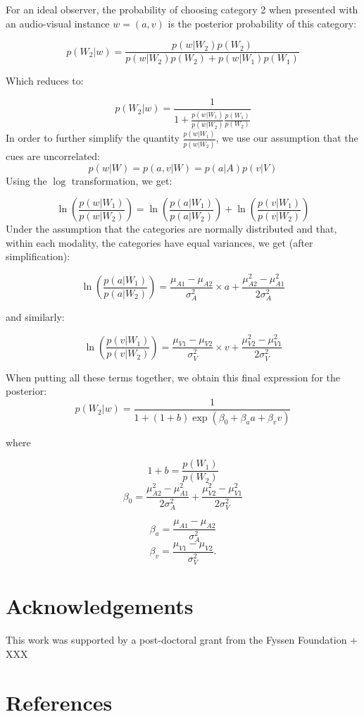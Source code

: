 \documentclass[english,floatsintext,man]{apa6}
\theoremstyle{definition}
\theoremstyle{definition}
\theoremstyle{definition}
\theoremstyle{remark}
\begin{document}
For an ideal observer, the probability of choosing category 2 when
presented with an audio-visual instance \(w = (a, v)\) is the posterior
probability of this category:

\[p(W_2 | w)=\frac{p(w|W_2)p(W_2)}{p(w|W_2)p(W_2)+p(w|W_1)p(W_1)}\]

Which reduces to:

\[p(W_2 | w)=\frac{1}{1+\frac{p(w|W_1)}{p(w|W_2)} \frac{p(W_1)}{p(W_2)}}\]
In order to further simplify the quantity \(\frac{p(w|W_1)}{p(w|W_2)}\),
we use our assumption that the cues are uncorrelated:
\[p(w | W) = p(a,v| W) = p(a| A)p(v| V)\] Using the \(\log\)
transformation, we get:

\[ \ln(\frac{p(w |W_1)}{p(w|W_2)})=\ln(\frac{p(a|W_1)}{p(a|W_2)})+\ln(\frac{p(v|W_1)}{p(v|W_2)}) \]
Under the assumption that the categories are normally distributed and
that, within each modality, the categories have equal variances, we get
(after simplification):

\[\ln(\frac{p(a|W_1)}{p(a|W_2)})=\frac{\mu_{A1}-\mu_{A2}}{\sigma^2_{A}}\times a+ \frac{\mu^2_{A2}-\mu^2_{A1}}{2\sigma^2_{A}}\]

and similarly:

\[\ln(\frac{p(v|W_1)}{p(v|W_2)})=\frac{\mu_{V1}-\mu_{V2}}{\sigma^2_{V}}\times v+ \frac{\mu^2_{V2}-\mu^2_{V1}}{2\sigma^2_{V}}\]

When putting all these terms together, we obtain this final expression
for the posterior:
\[p(W_2 | w)=\frac{1}{1+(1+b)\exp(\beta_0+\beta_aa+\beta_vv)}\]

where

\[1+b=\frac{p(W_1)}{p(W_2)}\]
\[\beta_0=\frac{\mu^2_{A2}-\mu^2_{A1}}{2\sigma^2_{A}}+\frac{\mu^2_{V2}-\mu^2_{V1}}{2\sigma^2_{V}}\]

\[\beta_a=\frac{\mu_{A1}-\mu_{A2}}{\sigma^2_{A}}\]
\[\beta_v=\frac{\mu_{V1}-\mu_{V2}}{\sigma^2_{V}}.\]

\section{Acknowledgements}\label{acknowledgements}

This work was supported by a post-doctoral grant from the Fyssen
Foundation + XXX

\section{References}\label{references}

\setlength{\parindent}{-0.5in} \setlength{\leftskip}{0.5in}
\end{document}

